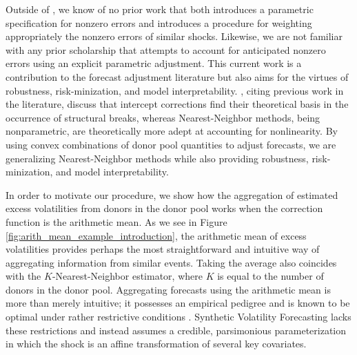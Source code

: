 \documentclass[11pt]{article}
\theoremstyle{definition}
\begin{document}
Outside of \citet{lin2021minimizing}, we know of no prior work that both introduces a parametric specification for nonzero errors and introduces a procedure for weighting appropriately the nonzero errors of similar shocks.  Likewise, we are not familiar with any prior scholarship that attempts to account for anticipated nonzero errors using an explicit parametric adjustment.  This current work is a contribution to the forecast adjustment literature but also aims for the virtues of robustness, risk-minization, and model interpretability.  \citet{guerron2017macroeconomic}, citing previous work in the literature, discuss that intercept corrections find their theoretical basis in the occurrence of structural breaks, whereas Nearest-Neighbor methods, being nonparametric, are theoretically more adept at accounting for nonlinearity.  By using convex combinations of donor pool quantities to adjust forecasts, we are generalizing Nearest-Neighbor methods while also providing robustness, risk-minization, and model interpretability.

In order to motivate our procedure, we show how the aggregation of estimated excess volatilities from donors in the donor pool works when the correction function is the arithmetic mean.  As we see in Figure \ref{fig:arith_mean_example_introduction}, the arithmetic mean of excess volatilities provides perhaps the most straightforward and intuitive way of aggregating information from similar events.  Taking the average also coincides with the $K$-Nearest-Neighbor estimator, where $K$ is equal to the number of donors in the donor pool. Aggregating forecasts using the arithmetic mean is more than merely intuitive; it possesses an empirical pedigree and is known to be optimal under rather restrictive conditions \citep{timmermann2006forecast}.  Synthetic Volatility Forecasting lacks these restrictions and instead assumes a credible, parsimonious parameterization in which the shock is an affine transformation of several key covariates. 
\end{document}
